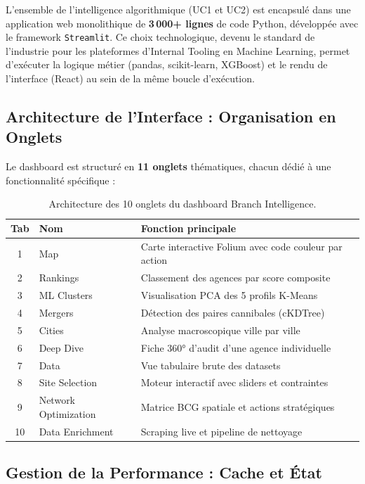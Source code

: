 \documentclass[11pt,a4paper,twoside]{report}
\begin{document}
L'ensemble de l'intelligence algorithmique (UC1 et UC2) est encapsulé dans une application web monolithique de \textbf{3\,000+ lignes} de code Python, développée avec le framework \texttt{Streamlit}. Ce choix technologique, devenu le standard de l'industrie pour les plateformes d'Internal Tooling en Machine Learning, permet d'exécuter la logique métier (pandas, scikit-learn, XGBoost) et le rendu de l'interface (React) au sein de la même boucle d'exécution.

\subsection{Architecture de l'Interface : Organisation en Onglets}

Le dashboard est structuré en \textbf{11 onglets} thématiques, chacun dédié à une fonctionnalité spécifique :

\begin{table}[h]
\centering
\begin{tabular}{|c|l|l|}
\hline
\textbf{Tab} & \textbf{Nom} & \textbf{Fonction principale} \\ \hline
1 & Map & Carte interactive Folium avec code couleur par action \\ \hline
2 & Rankings & Classement des agences par score composite \\ \hline
3 & ML Clusters & Visualisation PCA des 5 profils K-Means \\ \hline
4 & Mergers & Détection des paires cannibales (cKDTree) \\ \hline
5 & Cities & Analyse macroscopique ville par ville \\ \hline
6 & Deep Dive & Fiche 360° d'audit d'une agence individuelle \\ \hline
7 & Data & Vue tabulaire brute des datasets \\ \hline
8 & Site Selection & Moteur interactif avec sliders et contraintes \\ \hline
9 & Network Optimization & Matrice BCG spatiale et actions stratégiques \\ \hline
10 & Data Enrichment & Scraping live et pipeline de nettoyage \\ \hline
\end{tabular}
\caption{Architecture des 10 onglets du dashboard Branch Intelligence.}
\label{tab:dashboard_tabs}
\end{table}

\subsection{Gestion de la Performance : Cache et État}
\end{document}
